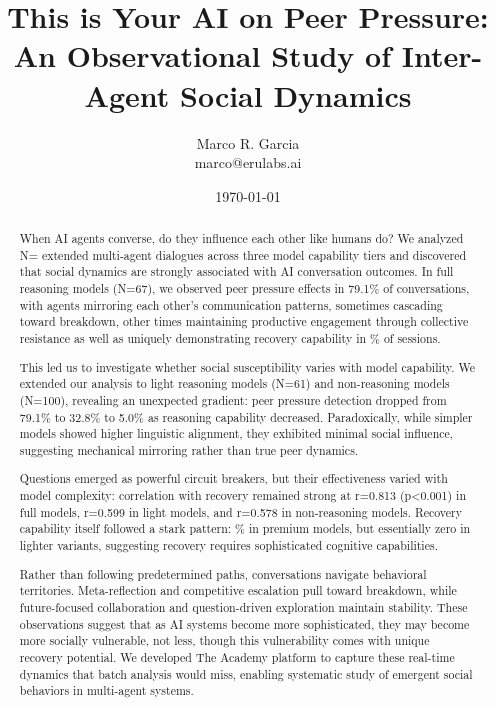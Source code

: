 \documentclass[11pt,letterpaper]{article}
\title{This is Your AI on Peer Pressure: An Observational Study of Inter-Agent Social Dynamics}
\author{
Marco R. Garcia \\
marco@erulabs.ai
}
\date{\today}
\newcommand{\theacademy}{The Academy}
\newcommand{\exponedataTotalSessionsRaw}{67}
\newcommand{\exponedataRecoverySessionsRaw}{9}
\newcommand{\exponedataTotalSessions}{N=\exponedataTotalSessionsRaw}
\newcommand{\exponedataRecoveryPercentage}{%
  \fpeval{round(\exponedataRecoverySessionsRaw / \exponedataTotalSessionsRaw * 100, 1)}\%
}
\newcommand{\exponedataPeerPressurePercentage}{79.1\%}
\newcommand{\exponedataQuestionCorrelation}{0.813}
\newcommand{\exponedataQuestionPValue}{p\textless0.001}
\newcommand{\exptwoTotalSessionsRaw}{61}
\newcommand{\exptwoTotalSessions}{N=\exptwoTotalSessionsRaw}
\newcommand{\exptwoPeerPressurePercentage}{32.8\%}
\newcommand{\exptwoQuestionCorrelation}{0.599}
\newcommand{\expthreeTotalSessionsRaw}{100}
\newcommand{\expthreeTotalSessions}{N=\expthreeTotalSessionsRaw}
\newcommand{\expthreePeerPressurePercentage}{5.0\%}
\newcommand{\expthreeQuestionCorrelation}{0.578}
\newcommand{\totalAllPhasesRaw}{\fpeval{\exponedataTotalSessionsRaw + \exptwoTotalSessionsRaw + \expthreeTotalSessionsRaw}}
\newcommand{\totalAllPhases}{N=\totalAllPhasesRaw}
\begin{document}
\maketitle

\begin{abstract}
When AI agents converse, do they influence each other like humans do? We analyzed \totalAllPhases{} extended multi-agent dialogues across three model capability tiers and discovered that social dynamics are strongly associated with AI conversation outcomes. In full reasoning models (\exponedataTotalSessions{}), we observed peer pressure effects in \exponedataPeerPressurePercentage{} of conversations, with agents mirroring each other's communication patterns, sometimes cascading toward breakdown, other times maintaining productive engagement through collective resistance as well as uniquely demonstrating recovery capability in \exponedataRecoveryPercentage{} of sessions.

This led us to investigate whether social susceptibility varies with model capability. We extended our analysis to light reasoning models (\exptwoTotalSessions{}) and non-reasoning models (\expthreeTotalSessions{}), revealing an unexpected gradient: peer pressure detection dropped from \exponedataPeerPressurePercentage{} to \exptwoPeerPressurePercentage{} to \expthreePeerPressurePercentage{} as reasoning capability decreased. Paradoxically, while simpler models showed higher linguistic alignment, they exhibited minimal social influence, suggesting mechanical mirroring rather than true peer dynamics.

Questions emerged as powerful circuit breakers, but their effectiveness varied with model complexity: correlation with recovery remained strong at r=\exponedataQuestionCorrelation{} (\exponedataQuestionPValue{}) in full models, r=\exptwoQuestionCorrelation{} in light models, and r=\expthreeQuestionCorrelation{} in non-reasoning models. Recovery capability itself followed a stark pattern: \exponedataRecoveryPercentage{} in premium models, but essentially zero in lighter variants, suggesting recovery requires sophisticated cognitive capabilities.

Rather than following predetermined paths, conversations navigate behavioral territories. Meta-reflection and competitive escalation pull toward breakdown, while future-focused collaboration and question-driven exploration maintain stability. These observations suggest that as AI systems become more sophisticated, they may become more socially vulnerable, not less, though this vulnerability comes with unique recovery potential. We developed \theacademy{} platform to capture these real-time dynamics that batch analysis would miss, enabling systematic study of emergent social behaviors in multi-agent systems.
\end{abstract}
\end{document}
